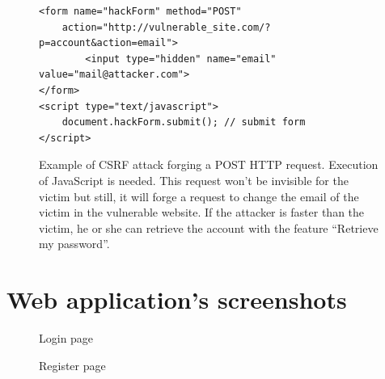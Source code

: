 \documentclass[a4paper,11pt,openany]{report}
\begin{document}
\begin{figure}[h!t]
  \begin{verbatim}
<form name="hackForm" method="POST" 
    action="http://vulnerable_site.com/?p=account&action=email">
        <input type="hidden" name="email" value="mail@attacker.com">
</form>
<script type="text/javascript">
    document.hackForm.submit(); // submit form
</script>
  \end{verbatim}
  \caption{%
  Example of CSRF attack forging a POST HTTP request. Execution of JavaScript is needed.
  This request won't be invisible for the victim but still, it will forge a request to change 
  the email of the victim in the vulnerable website. If the attacker is faster than the victim, he 
  or she can retrieve the account with the feature ``Retrieve my password''.
  }
  \label{figure:post_request}
\end{figure}
  

\chapter{Web application's screenshots} \label{app:screenshots}

\begin{figure}[ht!]
  \begin{center}
    \caption{Login page}
    \label{figure:login}
  \end{center}
\end{figure}

\begin{figure}[ht!]
  \begin{center}
    \caption{Register page}
    \label{figure:register}
  \end{center}
\end{figure}
  
\end{document}
